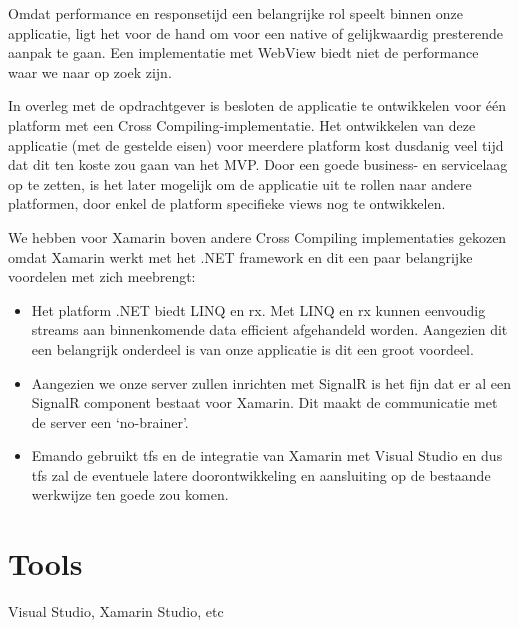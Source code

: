 Omdat performance en responsetijd een belangrijke rol speelt binnen onze applicatie, ligt het voor de hand om voor een native of gelijkwaardig presterende aanpak te gaan. Een implementatie met WebView biedt niet de performance waar we naar op zoek zijn. 
    
In overleg met de opdrachtgever is besloten de applicatie te ontwikkelen voor \'e\'en platform met een Cross Compiling-implementatie. Het ontwikkelen van deze applicatie (met de gestelde eisen) voor meerdere platform kost dusdanig veel tijd dat dit ten koste zou gaan van het MVP. Door een goede business- en servicelaag op te zetten, is het later mogelijk om de applicatie uit te rollen naar andere platformen, door enkel de platform specifieke views nog te ontwikkelen.

We hebben voor Xamarin boven andere Cross Compiling implementaties gekozen omdat Xamarin werkt met het .NET framework en dit een paar belangrijke voordelen met zich meebrengt:

\begin{itemize}
\item Het platform .NET biedt LINQ en \acf{rx}. Met LINQ en \ac{rx} kunnen eenvoudig streams aan binnenkomende data efficient afgehandeld worden. Aangezien dit een belangrijk onderdeel is van onze applicatie is dit een groot voordeel.
\item Aangezien we onze server zullen inrichten met SignalR is het fijn dat er al een SignalR component bestaat voor Xamarin. Dit maakt de communicatie met de server een `no-brainer'.
\item Emando gebruikt \acf{tfs} en de integratie van Xamarin met Visual Studio en dus \ac{tfs} zal de eventuele latere doorontwikkeling en aansluiting op de bestaande werkwijze ten goede zou komen. 
\end{itemize}

\section{Tools}

Visual Studio, Xamarin Studio, etc

